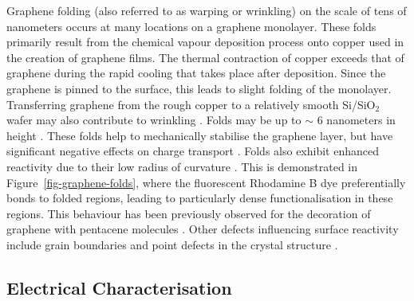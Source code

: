 \documentclass[
  a4paper,
]{scrbook}
\begin{document}
Graphene folding (also referred to as warping or wrinkling) on the scale
of tens of nanometers occurs at many locations on a graphene monolayer.
These folds primarily result from the chemical vapour deposition process
onto copper used in the creation of graphene films. The thermal
contraction of copper exceeds that of graphene during the rapid cooling
that takes place after deposition. Since the graphene is pinned to the
surface, this leads to slight folding of the monolayer. Transferring
graphene from the rough copper to a relatively smooth Si/SiO\(_2\) wafer
may also contribute to wrinkling
\autocite{Zhao2012,Zhu2012,Chhikara2013}. Folds may be up to \(\sim\) 6
nanometers in height \autocite{Zhu2012}. These folds help to
mechanically stabilise the graphene layer, but have significant negative
effects on charge transport \autocite{Geim2007,Chhikara2013,Zhu2012}.
Folds also exhibit enhanced reactivity due to their low radius of
curvature \autocite{Zhao2012}. This is demonstrated in
Figure~\ref{fig-graphene-folds}, where the fluorescent Rhodamine B dye
preferentially bonds to folded regions, leading to particularly dense
functionalisation in these regions. This behaviour has been previously
observed for the decoration of graphene with pentacene molecules
\autocite{Chhikara2013}. Other defects influencing surface reactivity
include grain boundaries and point defects in the crystal structure
\autocite{Zhao2012,Chhikara2013}.

\hypertarget{sec-electrical-characterisation-graphene}{%
\subsection{Electrical
Characterisation}\label{sec-electrical-characterisation-graphene}}
\end{document}
